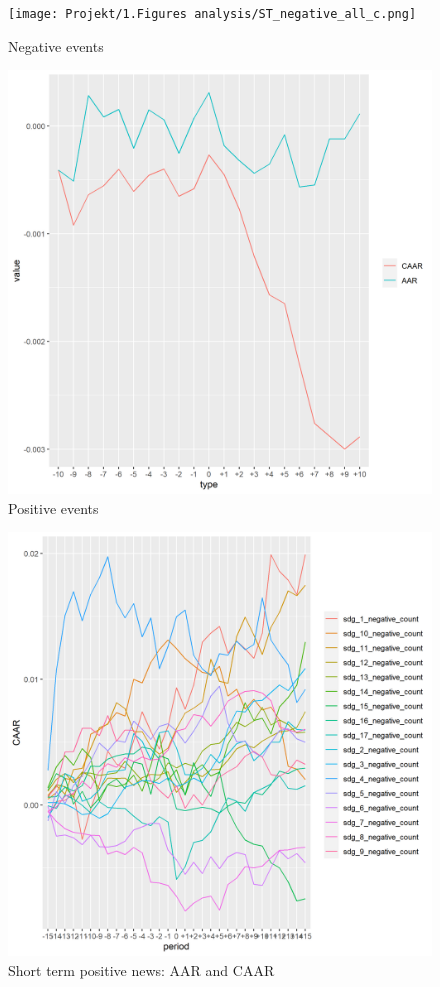 \begin{figure}[!tbp]
  \centering
  \begin{minipage}[b]{0.45\textwidth}
    \texttt{[image: Projekt/1.Figures analysis/ST\_negative\_all\_c.png]}
    \caption{Negative events}
  \end{minipage}
  \hfill
  \begin{minipage}[b]{0.45\textwidth}
    \includegraphics[scale=0.5]{Projekt/1.Figures analysis/ST_positive_all.png}
    \caption{Positive events}
  \end{minipage}
\end{figure}


\begin{figure}
    \centering
    \includegraphics[scale=0.6]{Projekt/1.Figures analysis/ST_negative_sdgs.png}
    \caption{Short term positive news: AAR and CAAR}
    \label{fig:ST_pos_news}
\end{figure}